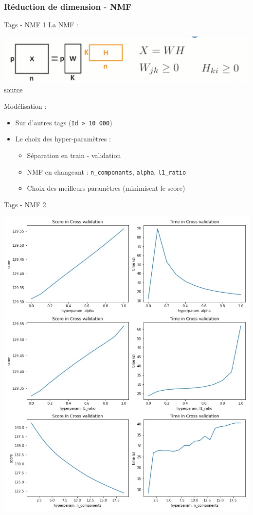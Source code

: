 \documentclass[10pt]{beamer}
\begin{document}
\subsubsection*{Réduction de dimension - NMF}
\begin{frame}{Tags - NMF 1}
La NMF :     
    \begin{center}
        \includegraphics[width=0.9\linewidth]{illustrations/NMF_graphique_explicationOC.png}\\
        {\tiny \color{blue} \href{https://openclassrooms.com/fr/courses/4379436-explorez-vos-donnees-avec-des-algorithmes-non-supervises/4379511-cherchez-les-variables-latentes-qui-expliquent-vos-donnees}{source}}
    \end{center}
Modélisation : 
\begin{itemize}
    \item Sur d'autres tags (\texttt{Id > 10 000}) 
    \item Le choix des hyper-paramètres : 
        \begin{itemize}
            \item Séparation en train - validation
            \item NMF en changeant : \texttt{n\_componants}, \texttt{alpha}, \texttt{l1\_ratio}
            \item Choix des meilleurs paramètres (minimisent le score)
        \end{itemize}
\end{itemize}
\end{frame}
\begin{frame}{Tags - NMF 2}
    \begin{center}
      \includegraphics[width=0.6\linewidth]{figures/tags_NMF.jpg}
    \end{center}
\end{frame}
\end{document}
